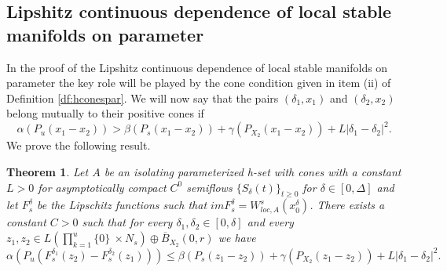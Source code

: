\documentclass[11pt, leqno]{amsart}
\newtheorem{thm}{Theorem}[section]
\theoremstyle{definition}
\begin{document}
\subsection{Lipshitz continuous dependence  of local stable manifolds on parameter} In the proof of the Lipshitz continuous dependence of local stable manifolds on  parameter the key role will be played by the cone condition given in item (ii) of Definition \ref{df:hconespar}. We will now say that the pairs $(\delta_1,x_1)$ and $(\delta_2,x_2)$ belong mutually to their positive cones if
$$\alpha(P_u (x_1-x_2))>  \beta(P_{s} (x_1-x_2)) + \gamma(P_{X_2} (x_1-x_2)) + L |\delta_1-\delta_2|^2.
$$ We prove the following result.
\begin{thm}
	Let $A$ be an isolating parameterized h-set with cones with a constant $L>0$ for asymptotically compact $C^0$ semiflows $\{ S_\delta(t) \}_{t\geq 0}$ for $\delta \in [0,\Delta]$ and let $F_s^\delta$ be the Lipschitz functions such that $im F_s^\delta = W^s_{loc,A}(x_0^\delta)$. There exists a constant
	$C > 0$ such that for every $\delta_1, \delta_2 \in [0,\delta]$ and every $z_1,z_2 \in L \left( \prod_{k=1}^{u} \{ 0 \}\ \times N_s\right) \oplus \overline{B}_{X_2}(0,r)$ we have
	$$
	\alpha(P_u(F^{\delta_1}_s(z_2) - F^{\delta_2}_s(z_1))) \leq  \beta(P_s(z_1-z_2)) + \gamma(P_{X_2}(z_1-z_2)) + L |\delta_1-\delta_2|^2.
	$$
\end{thm}
\end{document}
